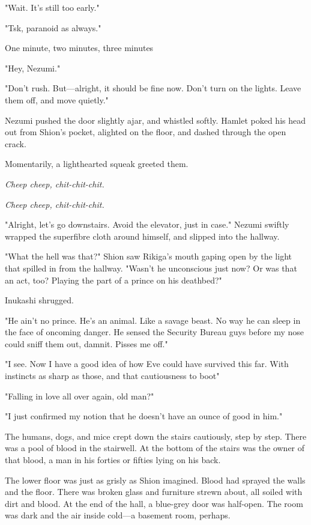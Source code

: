 "Wait. It's still too early."

"Tsk, paranoid as always."

One minute, two minutes, three minutes\el 

"Hey, Nezumi."

"Don't rush. But---alright, it should be fine now. Don't turn on the
lights. Leave them off, and move quietly."

Nezumi pushed the door slightly ajar, and whistled softly. Hamlet poked
his head out from Shion's pocket, alighted on the floor, and dashed
through the open crack.

Momentarily, a lighthearted squeak greeted them.

\emph{Cheep cheep, chit-chit-chit.}

\emph{Cheep cheep, chit-chit-chit.}

"Alright, let's go downstairs. Avoid the elevator, just in case." Nezumi
swiftly wrapped the superfibre cloth around himself, and slipped into
the hallway.

"What the hell was that?" Shion saw Rikiga's mouth gaping open by the
light that spilled in from the hallway. "Wasn't he unconscious just now?
Or was that an act, too? Playing the part of a prince on his deathbed?"

Inukashi shrugged.

"He ain't no prince. He's an animal. Like a savage beast. No way he can
sleep in the face of oncoming danger. He sensed the Security Bureau guys
before my nose could sniff them out, damnit. Pisses me off."

"I see. Now I have a good idea of how Eve could have survived this far.
With instincts as sharp as those, and that cautiousness to boot\el "

"Falling in love all over again, old man?"

"I just confirmed my notion that he doesn't have an ounce of good in
him."

The humans, dogs, and mice crept down the stairs cautiously, step by
step. There was a pool of blood in the stairwell. At the bottom of the
stairs was the owner of that blood, a man in his forties or fifties
lying on his back.

The lower floor was just as grisly as Shion imagined. Blood had sprayed
the walls and the floor. There was broken glass and furniture strewn
about, all soiled with dirt and blood. At the end of the hall, a
blue-grey door was half-open. The room was dark and the air inside
cold---a basement room, perhaps.

